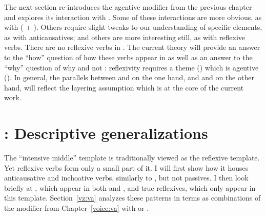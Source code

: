 \begin{exe}
\begin{xlist}
\begin{xlist}
\begin{exe}
\begin{xlist}
\begin{xlist}
\begin{exe}
\begin{xlist}
\begin{xlist}
\begin{exe}
\begin{exe}
\begin{xlist}
\begin{exe}
\begin{exe}
\begin{xlist}
\begin{exe}
\begin{exe}
\begin{exe}
\begin{exe}
\begin{exe}
\begin{xlist}
\begin{exe}
\begin{xlist}
\begin{exe}
\begin{exe}
\begin{xlist}
\begin{exe}
\begin{xlist}
\begin{exe}
\begin{exe}
\begin{exe}
\begin{xlist}
\begin{exe}
\begin{exe}
\begin{exe}
\begin{xlist}
\begin{exe}
\begin{xlist}
\begin{exe}
\begin{xlist}
\begin{exe}
\begin{xlist}
\begin{exe}
\begin{exe}
\begin{exe}
\begin{exe}
\begin{xlist}
\begin{exe}
\begin{xlist}
\begin{exe}
\begin{xlist}
\begin{exe}
\begin{xlist}
\begin{exe}
\begin{xlist}
\begin{exe}
\begin{xlist}
\begin{exe}
\begin{exe}
\begin{exe}
\begin{exe}
\begin{xlist}
\begin{exe}
\begin{xlist}
\begin{exe}
\begin{xlist}
\begin{exe}
The next section re-introduces the agentive modifier {\va} from the previous chapter and explores its interaction with {\vz}. Some of these interactions are more obvious, as with  ({\va} + {\pz}). Others require slight tweaks to our understanding of specific elements, as with anticausatives; and others are more interesting still, as with reflexive verbs. There are no reflexive verbs in {\tnif}. The current theory will provide an answer to the ``how'' question of how these verbs appear in {\thit} as well as an answer to the ``why'' question of why {\thit} and not {\tnif}: reflexivity requires a theme (\vz) which is agentive (\va). In general, the parallels between {\tkal} and {\thif} on the one hand, and {\tpie} and {\thit} on the other hand, will reflect the layering assumption which is at the core of the current work. 


\section{\thit: Descriptive generalizations} \label{vz:thit}
The ``intensive middle'' template {\thit} is traditionally viewed as the reflexive template. Yet reflexive verbs form only a small part of it. I will first show how it houses anticausative and inchoative verbs, similarly to {\tnif}, but not passives. I then look briefly at , which appear in both {\tnif} and {\thit}, and true reflexives, which only appear in this template. Section~\ref{vz:va} analyzes these patterns in terms as combinations of the modifier {\va} from Chapter~\ref{voice:va} with {\vz} or {\pz}.


\end{exe}
\end{xlist}
\end{exe}
\end{xlist}
\end{exe}
\end{xlist}
\end{exe}
\end{exe}
\end{exe}
\end{exe}
\end{xlist}
\end{exe}
\end{xlist}
\end{exe}
\end{xlist}
\end{exe}
\end{xlist}
\end{exe}
\end{xlist}
\end{exe}
\end{xlist}
\end{exe}
\end{exe}
\end{exe}
\end{exe}
\end{xlist}
\end{exe}
\end{xlist}
\end{exe}
\end{xlist}
\end{exe}
\end{xlist}
\end{exe}
\end{exe}
\end{exe}
\end{xlist}
\end{exe}
\end{exe}
\end{exe}
\end{xlist}
\end{exe}
\end{xlist}
\end{exe}
\end{exe}
\end{xlist}
\end{exe}
\end{xlist}
\end{exe}
\end{exe}
\end{exe}
\end{exe}
\end{exe}
\end{xlist}
\end{exe}
\end{exe}
\end{xlist}
\end{exe}
\end{exe}
\end{xlist}
\end{xlist}
\end{exe}
\end{xlist}
\end{xlist}
\end{exe}
\end{xlist}
\end{xlist}
\end{exe}

